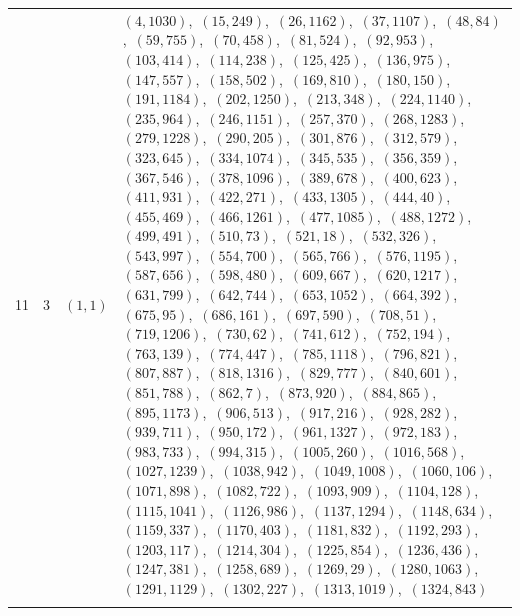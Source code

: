 \documentclass[11pt]{article}
\begin{document}
\begin{longtable}{@{}rrl>{\raggedright\arraybackslash}p{}@{}}
11 & 3 & $(1,1)$ & $(4,1030)$,\allowbreak\ $(15,249)$,\allowbreak\ $(26,1162)$,\allowbreak\ $(37,1107)$,\allowbreak\ $(48,84)$,\allowbreak\ $(59,755)$,\allowbreak\ $(70,458)$,\allowbreak\ $(81,524)$,\allowbreak\ $(92,953)$,\allowbreak\ $(103,414)$,\allowbreak\ $(114,238)$,\allowbreak\ $(125,425)$,\allowbreak\ $(136,975)$,\allowbreak\ $(147,557)$,\allowbreak\ $(158,502)$,\allowbreak\ $(169,810)$,\allowbreak\ $(180,150)$,\allowbreak\ $(191,1184)$,\allowbreak\ $(202,1250)$,\allowbreak\ $(213,348)$,\allowbreak\ $(224,1140)$,\allowbreak\ $(235,964)$,\allowbreak\ $(246,1151)$,\allowbreak\ $(257,370)$,\allowbreak\ $(268,1283)$,\allowbreak\ $(279,1228)$,\allowbreak\ $(290,205)$,\allowbreak\ $(301,876)$,\allowbreak\ $(312,579)$,\allowbreak\ $(323,645)$,\allowbreak\ $(334,1074)$,\allowbreak\ $(345,535)$,\allowbreak\ $(356,359)$,\allowbreak\ $(367,546)$,\allowbreak\ $(378,1096)$,\allowbreak\ $(389,678)$,\allowbreak\ $(400,623)$,\allowbreak\ $(411,931)$,\allowbreak\ $(422,271)$,\allowbreak\ $(433,1305)$,\allowbreak\ $(444,40)$,\allowbreak\ $(455,469)$,\allowbreak\ $(466,1261)$,\allowbreak\ $(477,1085)$,\allowbreak\ $(488,1272)$,\allowbreak\ $(499,491)$,\allowbreak\ $(510,73)$,\allowbreak\ $(521,18)$,\allowbreak\ $(532,326)$,\allowbreak\ $(543,997)$,\allowbreak\ $(554,700)$,\allowbreak\ $(565,766)$,\allowbreak\ $(576,1195)$,\allowbreak\ $(587,656)$,\allowbreak\ $(598,480)$,\allowbreak\ $(609,667)$,\allowbreak\ $(620,1217)$,\allowbreak\ $(631,799)$,\allowbreak\ $(642,744)$,\allowbreak\ $(653,1052)$,\allowbreak\ $(664,392)$,\allowbreak\ $(675,95)$,\allowbreak\ $(686,161)$,\allowbreak\ $(697,590)$,\allowbreak\ $(708,51)$,\allowbreak\ $(719,1206)$,\allowbreak\ $(730,62)$,\allowbreak\ $(741,612)$,\allowbreak\ $(752,194)$,\allowbreak\ $(763,139)$,\allowbreak\ $(774,447)$,\allowbreak\ $(785,1118)$,\allowbreak\ $(796,821)$,\allowbreak\ $(807,887)$,\allowbreak\ $(818,1316)$,\allowbreak\ $(829,777)$,\allowbreak\ $(840,601)$,\allowbreak\ $(851,788)$,\allowbreak\ $(862,7)$,\allowbreak\ $(873,920)$,\allowbreak\ $(884,865)$,\allowbreak\ $(895,1173)$,\allowbreak\ $(906,513)$,\allowbreak\ $(917,216)$,\allowbreak\ $(928,282)$,\allowbreak\ $(939,711)$,\allowbreak\ $(950,172)$,\allowbreak\ $(961,1327)$,\allowbreak\ $(972,183)$,\allowbreak\ $(983,733)$,\allowbreak\ $(994,315)$,\allowbreak\ $(1005,260)$,\allowbreak\ $(1016,568)$,\allowbreak\ $(1027,1239)$,\allowbreak\ $(1038,942)$,\allowbreak\ $(1049,1008)$,\allowbreak\ $(1060,106)$,\allowbreak\ $(1071,898)$,\allowbreak\ $(1082,722)$,\allowbreak\ $(1093,909)$,\allowbreak\ $(1104,128)$,\allowbreak\ $(1115,1041)$,\allowbreak\ $(1126,986)$,\allowbreak\ $(1137,1294)$,\allowbreak\ $(1148,634)$,\allowbreak\ $(1159,337)$,\allowbreak\ $(1170,403)$,\allowbreak\ $(1181,832)$,\allowbreak\ $(1192,293)$,\allowbreak\ $(1203,117)$,\allowbreak\ $(1214,304)$,\allowbreak\ $(1225,854)$,\allowbreak\ $(1236,436)$,\allowbreak\ $(1247,381)$,\allowbreak\ $(1258,689)$,\allowbreak\ $(1269,29)$,\allowbreak\ $(1280,1063)$,\allowbreak\ $(1291,1129)$,\allowbreak\ $(1302,227)$,\allowbreak\ $(1313,1019)$,\allowbreak\ $(1324,843)$\\
\addlinespace[3pt]
\end{longtable}
\endgroup
\end{document}

